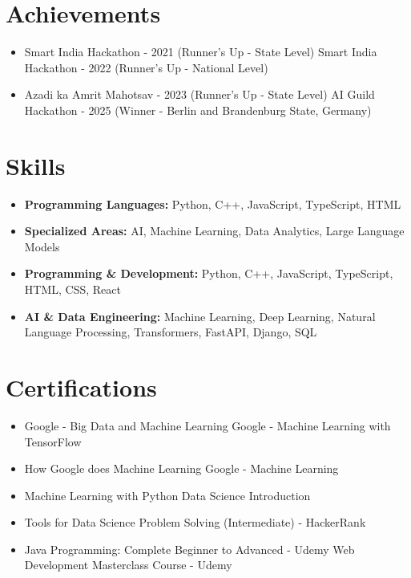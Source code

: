\documentclass[a4paper,10pt]{article}
\begin{document}
\section*{Achievements}
\begin{itemize}
\item Smart India Hackathon - 2021 (Runner's Up - State Level) \hfill Smart India Hackathon - 2022 (Runner's Up - National Level)
\item Azadi ka Amrit Mahotsav - 2023 (Runner's Up - State Level) \hfill AI Guild Hackathon - 2025 (Winner - Berlin and Brandenburg State, Germany)
\end{itemize}

\section*{Skills}
\begin{itemize}
  \item \textbf{Programming Languages:} Python, C++, JavaScript, TypeScript, HTML
  \item \textbf{Specialized Areas:} AI, Machine Learning, Data Analytics, Large Language Models
  \item \textbf{Programming \& Development:} Python, C++, JavaScript, TypeScript, HTML, CSS, React
  \item \textbf{AI \& Data Engineering:} Machine Learning, Deep Learning, Natural Language Processing, Transformers, FastAPI, Django, SQL
\end{itemize}

\section*{Certifications}
\begin{itemize}
\item Google - Big Data and Machine Learning \hfill Google - Machine Learning with TensorFlow
\item How Google does Machine Learning \hfill Google - Machine Learning
\item Machine Learning with Python \hfill Data Science Introduction
\item Tools for Data Science \hfill Problem Solving (Intermediate) - HackerRank
\item Java Programming: Complete Beginner to Advanced - Udemy \hfill Web Development Masterclass Course - Udemy
\end{itemize}
\end{document}
